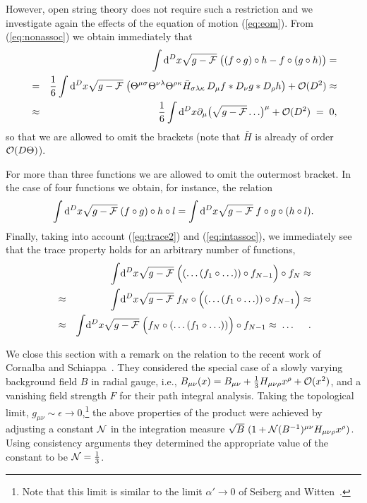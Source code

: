 \documentclass[a4paper,12pt]{article}
\newcommand {\ud} {\mathrm{d}}
\newcommand {\cF} {{\cal F}}
\newcommand {\cN}{{\cal N}}
\newcommand {\cO}{{\cal O}}
\begin{document}
However, open string theory does not require such a restriction and we
investigate again the effects of the equation of motion (\ref{eq:eom}).
{}From (\ref{eq:nonassoc}) we obtain immediately that
\begin{eqnarray}
  \label{eq:intassoc}
  & & \int \ud^{D} x \sqrt {g-\cF} \; 
      \bigl( (f \circ g) \circ h - f \circ (g \circ h) \bigr) =\\
  &=& \frac {1}{6} \int \ud^{D} x \sqrt {g-\cF} \; \bigl( 
      \Theta^{\mu\sigma} \Theta^{\nu\lambda} \Theta^{\rho\kappa}
      \bar H_{\sigma\lambda\kappa} \, 
      D_\mu f * D_\nu g * D_\rho h \bigr) + \cO(D^2) \approx \nonumber\\
  &\approx& \frac {1}{6} \int \ud^{D}x \partial_\mu \bigl(\sqrt {g-\cF} 
      \ldots \bigr)^\mu + \cO(D^2) \; =\; 0 , \nonumber
\end{eqnarray}
so that we are allowed to omit the brackets (note that $\bar H$ is already
of order $\cO(D\Theta)$). 

For more than three functions we are allowed to omit the outermost 
bracket. In the case of four functions we obtain, for instance, the relation
\begin{eqnarray}
  \label{eq:fourfunct}
 \int \ud^{D} x \sqrt {g-\cF} \; 
      (f \circ g) \circ h \circ l =
 \int \ud^{D} x \sqrt {g-\cF} \; 
      f \circ g \circ (h \circ l) .
\end{eqnarray}
Finally, taking into account (\ref{eq:trace2}) and (\ref{eq:intassoc}),
we immediately see that the trace property holds
for an arbitrary number of functions,
\begin{eqnarray}
  \label{eq:trace}
  & & \int\!\ud^{D} x \sqrt {g-\cF} \; 
  \Bigl((\ldots( f_1 \circ \ldots))\circ f_{N-1}\Bigr) \circ f_N \approx 
\nonumber\\
  &\approx& \int\!\ud^{D} x \sqrt {g-\cF} \; 
  f_N \circ \Bigl((\ldots( f_1 \circ \ldots))\circ f_{N-1}\Bigr) \approx 
\nonumber\\
  &\approx& \int\!\ud^{D} x \sqrt {g-\cF} \; 
  \Bigl(f_N \circ (\ldots( f_1 \circ \ldots ))\Bigr)\circ f_{N-1} \approx 
  \; \ldots\ \quad .
\end{eqnarray}

We close this section with a remark on the relation to the recent work of
Cornalba and Schiappa~\cite{Cornalba:2001sm}. They considered the special 
case of a slowly varying background field $B$ in radial gauge, i.e.,
$B_{\mu\nu}(x) = B_{\mu\nu} + \frac 13 H_{\mu\nu\rho} x^\rho +\cO(x^2)$,
and a vanishing field strength $F$ for their path integral analysis.
Taking the topological limit,
$g_{\mu\nu} \sim \epsilon \rightarrow 0$,\footnote{Note 
that this limit is similar to the limit
$\alpha'\!\rightarrow\!0$ of Seiberg and Witten~\cite{Seiberg:1999vs}.}
the above properties of the product were achieved by adjusting a constant 
$\cN$ in the integration measure 
$\sqrt{B}~(1 + \cN (B^{-1})^{\mu\nu}H_{\mu\nu\rho} x^\rho)$. Using 
consistency arguments they determined the appropriate value of the 
constant to be $\cN = \frac 13$.
\end{document}
